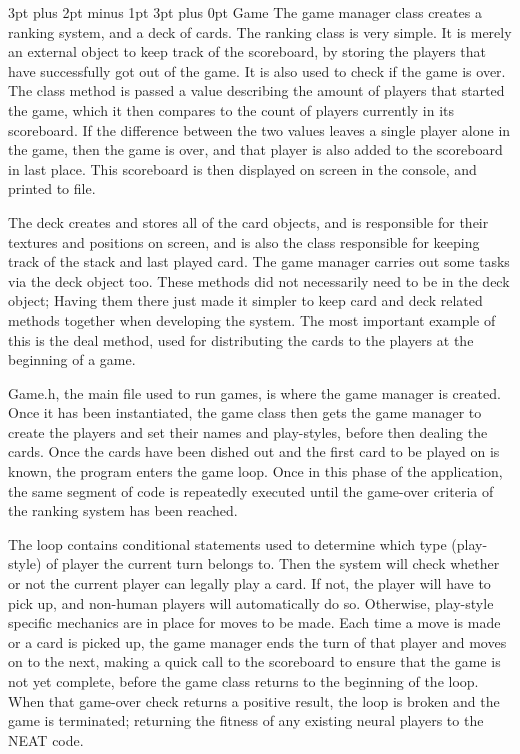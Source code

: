 \documentclass[12pt,a4paper]{article}
\makeatletter
\renewcommand\subsection{\@startsection {subsection}{1}{2mm} %
                               {3pt plus 2pt minus 1pt} %
                               {3pt plus 0pt} %
                               {\normalfont\bfseries}}
\makeatother
\begin{document}
\subsection{Game}
The game manager class creates a ranking system, and a deck of cards. The ranking class is very simple. It is merely an external object to keep track of the scoreboard, by storing the players that have successfully got out of the game. It is also used to check if the game is over. The class method is passed a value describing the amount of players that started the game, which it then compares to the count of players currently in its scoreboard. If the difference between the two values leaves a single player alone in the game, then the game is over, and that player is also added to the scoreboard in last place. This scoreboard is then displayed on screen in the console, and printed to file.

The deck creates and stores all of the card objects, and is responsible for their textures and positions on screen, and is also the class responsible for keeping track of the stack and last played card. The game manager carries out some tasks via the deck object too. These methods did not necessarily need to be in the deck object; Having them there just made it simpler to keep card and deck related methods together when developing the system. The most important example of this is the deal method, used for distributing the cards to the players at the beginning of a game.

Game.h, the main file used to run games, is where the game manager is created. Once it has been instantiated, the game class then gets the game manager to create the players and set their names and play-styles, before then dealing the cards. Once the cards have been dished out and the first card to be played on is known, the program enters the game loop. Once in this phase of the application, the same segment of code is repeatedly executed until the game-over criteria of the ranking system has been reached. 

The loop contains conditional statements used to determine which type (play-style) of player the current turn belongs to. Then the system will check whether or not the current player can legally play a card. If not, the player will have to pick up, and non-human players will automatically do so. Otherwise, play-style specific mechanics are in place for moves to be made. Each time a move is made or a card is picked up, the game manager ends the turn of that player and moves on to the next, making a quick call to the scoreboard to ensure that the game is not yet complete, before the game class returns to the beginning of the loop. When that game-over check returns a positive result, the loop is broken and the game is terminated; returning the fitness of any existing neural players to the NEAT code.
\end{document}
